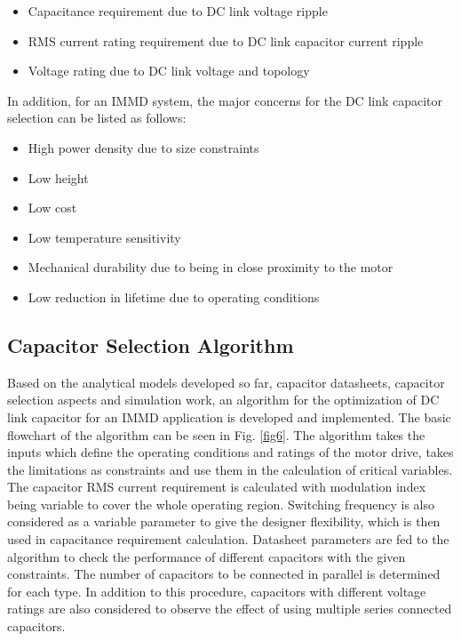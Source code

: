 \documentclass[conference,a4paper,twocolumn]{IEEEtran}
\begin{document}
\begin{itemize}
  \item Capacitance requirement due to DC link voltage ripple
  \item RMS current rating requirement due to DC link capacitor current ripple
  \item Voltage rating due to DC link voltage and topology
\end{itemize}

In addition, for an IMMD system, the major concerns for the DC link capacitor selection can be listed as follows:

\begin{itemize}
  \item High power density due to size constraints
  \item Low height
  \item Low cost
  \item Low temperature sensitivity
  \item Mechanical durability due to being in close proximity to the motor
  \item Low reduction in lifetime due to operating conditions
\end{itemize}


\subsection{Capacitor Selection Algorithm}

Based on the analytical models developed so far, capacitor datasheets, capacitor selection aspects and simulation work, an algorithm for the optimization of DC link capacitor for an IMMD application is developed and implemented. The basic flowchart of the algorithm can be seen in Fig. \ref{fig6}. The algorithm takes the inputs which define the operating conditions and ratings of the motor drive, takes the limitations as constraints and use them in the calculation of critical variables. The capacitor RMS current requirement is calculated with modulation index being variable to cover the whole operating region. Switching frequency is also considered as a variable parameter to give the designer flexibility, which is then used in capacitance requirement calculation. Datasheet parameters are fed to the algorithm to check the performance of different capacitors with the given constraints. The number of capacitors to be connected in parallel is determined for each type. In addition to this procedure, capacitors with different voltage ratings are also considered to observe the effect of using multiple series connected capacitors.
\end{document}
